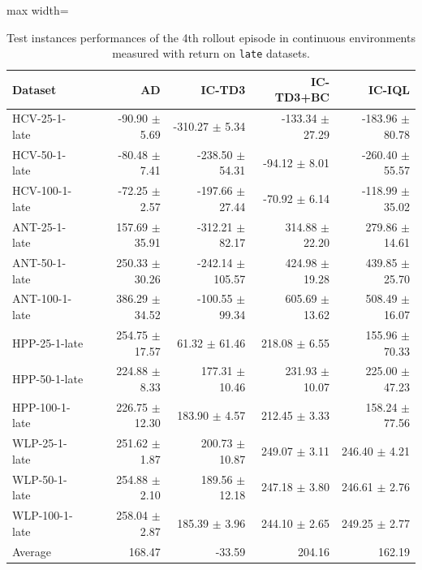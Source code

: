 \documentclass{article}
\begin{document}
\begin{table}[ht]
    \label{tab:}
    \begin{center}
    \caption{Test instances performances of the 4th rollout episode in continuous environments measured with return on \texttt{late} datasets.}
    \begin{small}
    \begin{adjustbox}{max width=\columnwidth}
		\begin{tabular}{l|rrrr}
		\toprule
	\textbf{Dataset} & \textbf{AD} & \textbf{IC-TD3} & \textbf{IC-TD3+BC} & \textbf{IC-IQL}\\
\midrule
HCV-25-1-late & -90.90 $\pm$ 5.69 & -310.27 $\pm$ 5.34 & -133.34 $\pm$ 27.29 & -183.96 $\pm$ 80.78\\
HCV-50-1-late & -80.48 $\pm$ 7.41 & -238.50 $\pm$ 54.31 & -94.12 $\pm$ 8.01 & -260.40 $\pm$ 55.57\\
HCV-100-1-late & -72.25 $\pm$ 2.57 & -197.66 $\pm$ 27.44 & -70.92 $\pm$ 6.14 & -118.99 $\pm$ 35.02\\
ANT-25-1-late & 157.69 $\pm$ 35.91 & -312.21 $\pm$ 82.17 & 314.88 $\pm$ 22.20 & 279.86 $\pm$ 14.61\\
ANT-50-1-late & 250.33 $\pm$ 30.26 & -242.14 $\pm$ 105.57 & 424.98 $\pm$ 19.28 & 439.85 $\pm$ 25.70\\
ANT-100-1-late & 386.29 $\pm$ 34.52 & -100.55 $\pm$ 99.34 & 605.69 $\pm$ 13.62 & 508.49 $\pm$ 16.07\\
HPP-25-1-late & 254.75 $\pm$ 17.57 & 61.32 $\pm$ 61.46 & 218.08 $\pm$ 6.55 & 155.96 $\pm$ 70.33\\
HPP-50-1-late & 224.88 $\pm$ 8.33 & 177.31 $\pm$ 10.46 & 231.93 $\pm$ 10.07 & 225.00 $\pm$ 47.23\\
HPP-100-1-late & 226.75 $\pm$ 12.30 & 183.90 $\pm$ 4.57 & 212.45 $\pm$ 3.33 & 158.24 $\pm$ 77.56\\
WLP-25-1-late & 251.62 $\pm$ 1.87 & 200.73 $\pm$ 10.87 & 249.07 $\pm$ 3.11 & 246.40 $\pm$ 4.21\\
WLP-50-1-late & 254.88 $\pm$ 2.10 & 189.56 $\pm$ 12.18 & 247.18 $\pm$ 3.80 & 246.61 $\pm$ 2.76\\
WLP-100-1-late & 258.04 $\pm$ 2.87 & 185.39 $\pm$ 3.96 & 244.10 $\pm$ 2.65 & 249.25 $\pm$ 2.77\\
\midrule
Average & 168.47 & -33.59 & 204.16 & 162.19\\
\end{tabular}
        \end{adjustbox}
    \end{small}
    \end{center}
    \vskip -0.1in
\end{table}
\end{document}
